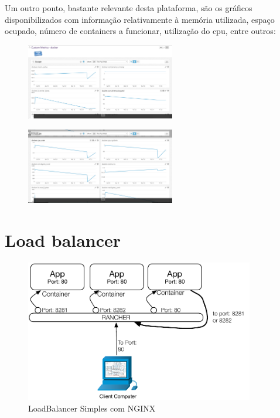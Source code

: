 \documentclass[pdftex,12pt,a4paper]{report}
\begin{document}
Um outro ponto, bastante relevante desta plataforma, são os gráficos disponibilizados com informação relativamente à memória utilizada, espaço ocupado, número de containers a funcionar, utilização do cpu, entre outros:

\begin{figure}[!htb]
\centering
\begin{minipage}{.5\textwidth}
  \centering
  \includegraphics[width=65mm,scale=1]{imagens/datadog_metrics_docker.png}
  \label{fig:metricas1}
\end{minipage}%
\begin{minipage}{.5\textwidth}
  \centering
  \includegraphics[width=65mm,scale=1]{imagens/datadog_metrics_docker2.png}
  \label{fig:metricas2}
\end{minipage}
\end{figure}

\newpage

\section{Load balancer}

\begin{figure}[!htb]
\center
 \includegraphics[width=100mm,scale=1]{imagens/simple_load_balancer.pdf}
 \caption{LoadBalancer Simples com NGINX}
 \label{fig:dashboard}
\end{figure}
\end{document}
